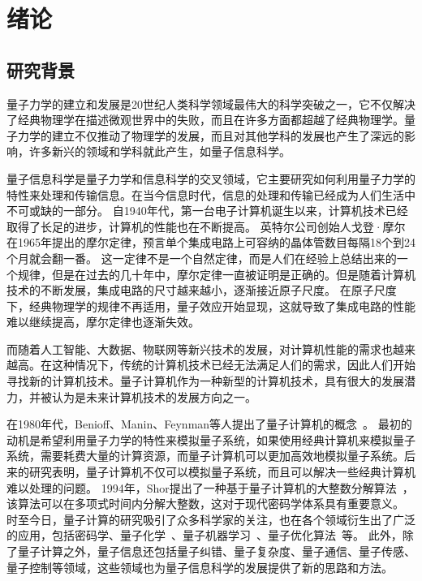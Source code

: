 \chapter{绪论}

\section{研究背景}

量子力学的建立和发展是20世纪人类科学领域最伟大的科学突破之一，它不仅解决了经典物理学在描述微观世界中的失败，而且在许多方面都超越了经典物理学。量子力学的建立不仅推动了物理学的发展，而且对其他学科的发展也产生了深远的影响，许多新兴的领域和学科就此产生，如量子信息科学。

量子信息科学是量子力学和信息科学的交叉领域，它主要研究如何利用量子力学的特性来处理和传输信息。在当今信息时代，信息的处理和传输已经成为人们生活中不可或缺的一部分。
自1940年代，第一台电子计算机诞生以来，计算机技术已经取得了长足的进步，计算机的性能也在不断提高。
英特尔公司创始人戈登·摩尔在1965年提出的摩尔定律，预言单个集成电路上可容纳的晶体管数目每隔18个到24个月就会翻一番。
这一定律不是一个自然定律，而是人们在经验上总结出来的一个规律，但是在过去的几十年中，摩尔定律一直被证明是正确的。但是随着计算机技术的不断发展，集成电路的尺寸越来越小，逐渐接近原子尺度。
在原子尺度下，经典物理学的规律不再适用，量子效应开始显现，这就导致了集成电路的性能难以继续提高，摩尔定律也逐渐失效。

而随着人工智能、大数据、物联网等新兴技术的发展，对计算机性能的需求也越来越高。在这种情况下，传统的计算机技术已经无法满足人们的需求，因此人们开始寻找新的计算机技术。量子计算机作为一种新型的计算机技术，具有很大的发展潜力，并被认为是未来计算机技术的发展方向之一。

在1980年代，Benioff、Manin、Feynman等人提出了量子计算机的概念~\cite{Benioff1980,Benioff1982a,Benioff1982b,Manin1980,Feynman1982}。
最初的动机是希望利用量子力学的特性来模拟量子系统，如果使用经典计算机来模拟量子系统，需要耗费大量的计算资源，而量子计算机可以更加高效地模拟量子系统。后来的研究表明，量子计算机不仅可以模拟量子系统，而且可以解决一些经典计算机难以处理的问题。
1994年，Shor提出了一种基于量子计算机的大整数分解算法~\cite{shor1994algorithms}，该算法可以在多项式时间内分解大整数，这对于现代密码学体系具有重要意义。
时至今日，量子计算的研究吸引了众多科学家的关注，也在各个领域衍生出了广泛的应用，包括密码学、量子化学~\cite{peruzzo2014variational, kandala2017hardwarea,li2022toward}、量子机器学习~\cite{beer2020training,huang2021experimental,havlivcek2019supervised,mitarai2018quantum}、量子优化算法~\cite{farhi2014quantum,moll2018quantum}等。
此外，除了量子计算之外，量子信息还包括量子纠错、量子复杂度、量子通信、量子传感、量子控制等领域，这些领域也为量子信息科学的发展提供了新的思路和方法。

